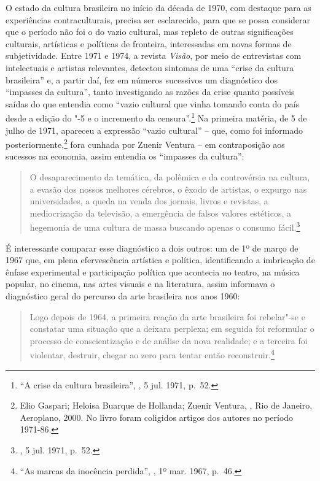 \asterisc

O estado da cultura brasileira no início da década de 1970, com destaque
para as experiências contraculturais, precisa ser esclarecido, para que
se possa considerar que o período não foi o do vazio cultural, mas repleto
de outras significações culturais, artísticas e políticas de fronteira,
interessadas em novas formas de subjetividade. Entre 1971 e 1974, a
revista \emph{Visão}, por meio de entrevistas com intelectuais e artistas
relevantes, detectou sintomas de uma ``crise da cultura brasileira'' e,
a partir daí, fez em números sucessivos um diagnóstico dos ``impasses da
cultura'', tanto investigando as razões da crise quanto possíveis saídas
do que entendia como ``vazio cultural que vinha tomando conta do
país desde a edição do "-5 e o incremento da censura''.\footnote{``A
  crise da cultura brasileira'', {}, 5 jul. 1971, p.~52.} Na
primeira matéria, de 5 de julho de 1971, apareceu a expressão ``vazio
cultural'' -- que, como foi informado posteriormente,\footnote{Elio
  Gaspari; Heloisa Buarque de Hollanda; Zuenir Ventura, {}, Rio de Janeiro, Aeroplano, 2000.
  No livro foram coligidos artigos dos autores no período 1971-86.}
fora cunhada por Zuenir Ventura -- em contraposição aos sucessos na
economia, assim entendia os ``impasses da cultura'':

\begin{quote}
O desaparecimento da temática, da polêmica e da controvérsia na cultura,
a evasão dos nossos melhores cérebros, o êxodo de artistas, o expurgo
nas universidades, a queda na venda dos jornais, livros e revistas, a
mediocrização da televisão, a emergência de falsos valores estéticos, a
hegemonia de uma cultura de massa buscando apenas o consumo
fácil.\footnote{{}, 5 jul. 1971, p.~52.}
\end{quote}

É interessante comparar esse diagnóstico a dois outros: um de 1º de
março de 1967 que, em plena efervescência artística e política,
identificando a imbricação de ênfase experimental e participação
política que acontecia no teatro, na música popular, no cinema, nas
artes visuais e na literatura, assim informava o diagnóstico geral do
percurso da arte brasileira nos anos 1960:

\begin{quote}
Logo depois de 1964, a primeira reação da arte brasileira foi rebelar"-se
e constatar uma situação que a deixara perplexa; em seguida foi
reformular o processo de conscientização e de análise da nova realidade;
e a terceira foi violentar, destruir, chegar ao zero para tentar então
reconstruir.\footnote{``As marcas da inocência perdida'', {},
  1º mar. 1967, p.~46.}
\end{quote}

